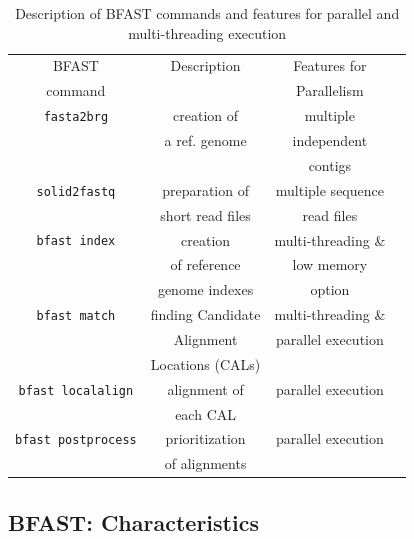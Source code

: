 \documentclass{acm_proc_article-sp}
\begin{document}
\begin{table}
\begin{tabular}{|c|c|c|c|} 
  \hline BFAST & Description & Features for \\ command & & Parallelism
  \\ \hline \hline \texttt{fasta2brg} & creation of & multiple \\ &a ref. genome &
  independent \\ & & contigs \\ \hline
  \texttt{solid2fastq} & preparation of & multiple sequence \\ & short
  read files & read files\\ \hline

\texttt{bfast index} & creation  & multi-threading \& \\
& of reference  & low memory  \\ 
&genome indexes&option \\
 
  \hline
\texttt{bfast match} & finding Candidate   &  multi-threading \& \\

& Alignment &  parallel execution \\
& Locations (CALs) & \\\hline
\texttt{bfast localalign} & alignment of&   parallel execution \\
&  each CAL   & \\

  \hline
\texttt{bfast postprocess} & prioritization   &  parallel execution \\ 
& of alignments & \\
\hline


\hline
\end{tabular} \caption{Description of BFAST commands and features for parallel and multi-threading execution}
 \label{table:bfast-summary} 
\end{table}


\subsection{BFAST: Characteristics}
\end{document}
